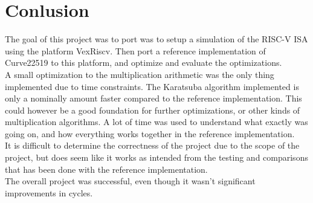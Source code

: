 \section{Conlusion}
The goal of this project was to port was to setup a simulation of the RISC-V ISA using the platform
VexRiscv. Then port a reference implementation of Curve22519 to this platform, and optimize and evaluate the optimizations. \\
A small optimization to the multiplication arithmetic was the only thing implemented due to time constraints. The Karatsuba algorithm implemented is only a nominally amount faster compared to the reference implementation. This could however be a good foundation for further optimizations, or other kinds of multiplication algorithms. A lot of time was used to understand what exactly was going on, and how everything works together in the reference implementation.\\
It is difficult to determine the correctness of the project due to the scope of the project, but does seem like it works as intended from the testing and comparisons that has been done with the reference implementation.\\
The overall project was successful, even though it wasn't significant improvements in cycles.
